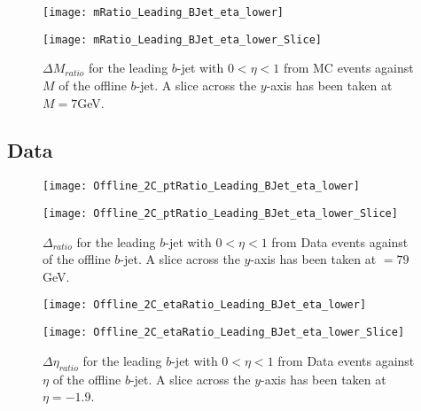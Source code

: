 		\begin{figure}[h]
			\centering

			\begin{minipage}[h]{0.33\linewidth}
				\texttt{[image: mRatio\_Leading\_BJet\_eta\_lower]}
			\end{minipage}
			\quad
			\begin{minipage}[h]{0.33\linewidth}
				\texttt{[image: mRatio\_Leading\_BJet\_eta\_lower\_Slice]}
			\end{minipage}
			\caption{$\Delta M_{ratio}$ for the leading \pt $b$-jet with $0 < \eta < 1$ from MC events against $M$ of the offline $b$-jet. A slice across the $y$-axis has been taken at $M=7$GeV. }
			\label{fig:MC:leadingbmcentral}
		\end{figure}

\newpage
		\subsection{Data}
		
				\begin{figure}[h]
					\centering
					\begin{minipage}[h]{0.33\linewidth}
						\texttt{[image: Offline\_2C\_ptRatio\_Leading\_BJet\_eta\_lower]}
						
					\end{minipage}
					\quad
					\begin{minipage}[h]{0.33\linewidth}
						\texttt{[image: Offline\_2C\_ptRatio\_Leading\_BJet\_eta\_lower\_Slice]}
					\end{minipage}
					\caption{$\Delta $\pt$_{ratio}$ for the leading \pt $b$-jet with $0 < \eta < 1$ from Data events against \pt of the offline $b$-jet. A slice across the $y$-axis has been taken at \pt$=79$GeV. }
					\label{fig:D:leadingbptcentral}
				\end{figure}
				
				\begin{figure}[h]
					\centering
					
					\begin{minipage}[h]{0.33\linewidth}
						\texttt{[image: Offline\_2C\_etaRatio\_Leading\_BJet\_eta\_lower]}
					\end{minipage}
					\quad
					\begin{minipage}[h]{0.33\linewidth}
						\texttt{[image: Offline\_2C\_etaRatio\_Leading\_BJet\_eta\_lower\_Slice]}
					\end{minipage}
					\caption{$\Delta \eta_{ratio}$ for the leading \pt $b$-jet with $0 < \eta < 1$ from Data events against $\eta$ of the offline $b$-jet. A slice across the $y$-axis has been taken at $\eta=-1.9$. }
					\label{fig:D:leadingbetacentral}
				\end{figure}
				
